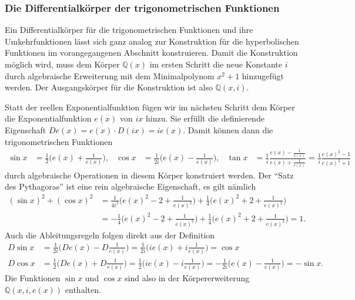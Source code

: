 %
%
\subsubsection{Die Differentialkörper der trigonometrischen Funktionen}
Ein Differentialkörper für die trigonometrischen Funktionen und ihre
Umkehrfunktionen lässt sich ganz analog zur Konstruktion für die 
hyperbolischen Funktionen im vorangegangenen Abschnitt konstruieren.
Damit die Konstruktion möglich wird, muss dem Körper $\mathbb{Q}(x)$
im ersten Schritt die neue Konstante $i$ durch algebraische
Erweiterung mit dem Minimalpolynom $x^2+1$ hinzugefügt werden.
Der Ausgangskörper für die Konstruktion ist also $\mathbb{Q}(x,i)$.

Statt der reellen Exponentialfunktion fügen wir im nächsten Schritt 
dem Körper die Exponentialfunktion $e(x)$ von $ix$ hinzu.
Sie erfüllt die definierende Eigenschaft $De(x) = e(x)\cdot D(ix) = ie(x)$.
Damit können dann die trigonometrischen Funktionen
\begin{align*}
\sin x
&=
\frac12\biggl(
e(x)+\frac{1}{e(x)}
\biggr),
&
\cos x
&=
\frac1{2i}\biggl(
e(x)-\frac{1}{e(x)}
\biggr),
&
\tan x
&=
\frac{1}{i}
\frac{
\displaystyle e(x)-\frac{1}{e(x)}
}{
\displaystyle e(x)+\frac{1}{e(x)}
}
=
\frac{1}{i}\frac{e(x)^2-1}{e(x)^2+1}
\end{align*}
durch algebraische Operationen in diesem Körper konstruiert werden.
Der ``Satz des Pythagoras'' ist eine rein algebraische Eigenschaft,
es gilt nämlich
\begin{align*}
(\sin x)^2 + (\cos x)^2
&=
\frac1{4i^2}
\biggl(
e(x)^2 - 2 + \frac{1}{e(x)^2}
\biggr)
+
\frac14
\biggl(
e(x)^2 + 2 + \frac{1}{e(x)^2}
\biggr)
\\
&=
-
\frac1{4}
\biggl(
e(x)^2 - 2 + \frac{1}{e(x)^2}
\biggr)
+
\frac14
\biggl(
e(x)^2 + 2 + \frac{1}{e(x)^2}
\biggr)
=
1.
\end{align*}
Auch die Ableitungsregeln folgen direkt aus der Definition
\begin{align*}
D\sin x
&=
\frac{1}{2i}
\biggl(
De(x) - D\frac{1}{e(x)}
\biggr)
=
\frac{1}{2i}
\biggl(
ie(x) + i\frac{1}{e(x)}
\biggr)
=
\cos x
\\
D\cos x
&=
\frac12
\biggl(
De(x) + D\frac{1}{e(x)}
\biggr)
=
\frac12
\biggl(
ie(x) - i\frac{1}{e(x)}
\biggr)
=
-
\frac1{2i}
\biggl(
e(x) - \frac{1}{e(x)}
\biggr)
=
-
\sin x.
\end{align*}
Die Funktionen $\sin x$ und $\cos x$ sind also in der Körpererweiterung
$\mathbb{Q}(x,i,e(x))$ enthalten.

